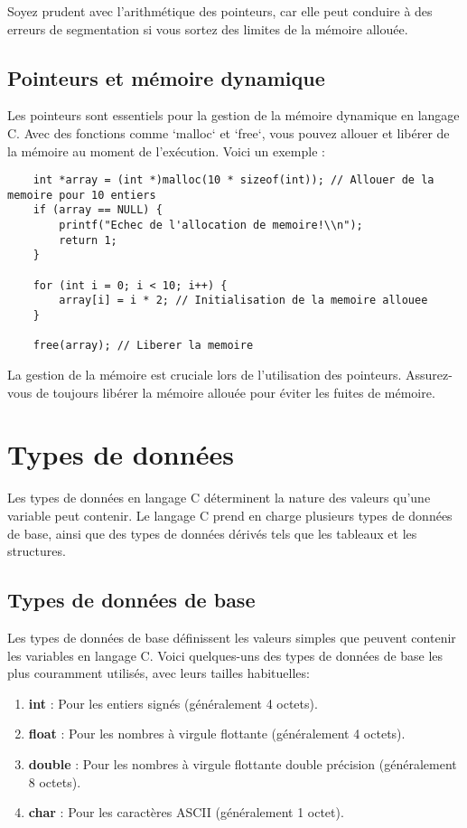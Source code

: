 Soyez prudent avec l'arithmétique des pointeurs, car elle peut conduire à des erreurs de segmentation si vous sortez des limites de la mémoire allouée.

\subsection{Pointeurs et mémoire dynamique}

Les pointeurs sont essentiels pour la gestion de la mémoire dynamique en langage C. Avec des fonctions comme `malloc` et `free`, vous pouvez allouer et libérer de la mémoire au moment de l'exécution. Voici un exemple :

\begin{lstlisting}
	int *array = (int *)malloc(10 * sizeof(int)); // Allouer de la memoire pour 10 entiers
	if (array == NULL) {
		printf("Echec de l'allocation de memoire!\\n");
		return 1;
	}
	
	for (int i = 0; i < 10; i++) {
		array[i] = i * 2; // Initialisation de la memoire allouee
	}
	
	free(array); // Liberer la memoire
\end{lstlisting}

La gestion de la mémoire est cruciale lors de l'utilisation des pointeurs. Assurez-vous de toujours libérer la mémoire allouée pour éviter les fuites de mémoire.


\section{Types de données}

Les types de données en langage C déterminent la nature des valeurs qu'une variable peut contenir. Le langage C prend en charge plusieurs types de données de base, ainsi que des types de données dérivés tels que les tableaux et les structures.

\subsection{Types de données de base}

Les types de données de base définissent les valeurs simples que peuvent contenir les variables en langage C. Voici quelques-uns des types de données de base les plus couramment utilisés, avec leurs tailles habituelles:

\begin{enumerate}[label=\alph*)]
	\item \textbf{int} : Pour les entiers signés (généralement 4 octets).
	\item \textbf{float} : Pour les nombres à virgule flottante (généralement 4 octets).
	\item \textbf{double} : Pour les nombres à virgule flottante double précision (généralement 8 octets).
	\item \textbf{char} : Pour les caractères ASCII (généralement 1 octet).
\end{enumerate}

